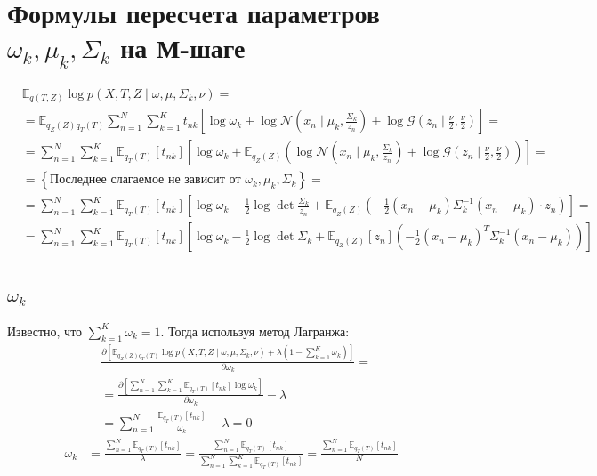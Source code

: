 \documentclass[12pt, a4paper]{article}
\begin{document}
    \section{Формулы пересчета параметров $\omega_k, \mu_k, \Sigma_k$ на М-шаге}
        \begin{align*}
            &\mathbb{E}_{q(T, Z)}\log p(X, T, Z\mid \omega, \mu, \Sigma_k, \nu) = \\
            & = \mathbb{E}_{q_Z(Z)q_T(T)}\sum_{n=1}^{N}\sum_{k=1}^{K}t_{nk}\left[\log\omega_k + \log\mathcal{N}(x_n\mid \mu_k, \frac{\Sigma_k}{z_n}) + \log\mathcal{G}(z_n\mid \frac{\nu}{2}, \frac{\nu}{2}) \right] =\\
            & = \sum_{n=1}^{N}\sum_{k=1}^{K}\mathbb{E}_{q_T(T)}\left[t_{nk}\right]\left[\log\omega_k + \mathbb{E}_{q_Z(Z)}\left(\log\mathcal{N}(x_n\mid \mu_k, \frac{\Sigma_k}{z_n}) + \log\mathcal{G}(z_n\mid \frac{\nu}{2}, \frac{\nu}{2})\right) \right] =\\
            & = \left\{\text{Последнее слагаемое не зависит от $\omega_k, \mu_k, \Sigma_k$}\right\} = \\
            & = \sum_{n=1}^{N}\sum_{k=1}^{K}\mathbb{E}_{q_T(T)}\left[t_{nk}\right]\left[\log\omega_k - \frac{1}{2}\log\det{\frac{\Sigma_k}{z_n}} + \mathbb{E}_{q_Z(Z)}\left(- \frac{1}{2}(x_n - \mu_k)\Sigma_k^{-1}(x_n - \mu_k) \cdot z_n \right)\right] =\\
            & = \sum_{n=1}^{N}\sum_{k=1}^{K}\mathbb{E}_{q_T(T)}\left[t_{nk}\right]\left[\log\omega_k -\frac{1}{2}\log\det{\Sigma_k} + \mathbb{E}_{q_Z(Z)}\left[z_{n}\right]\left(- \frac{1}{2}(x_n - \mu_k)^T\Sigma_k^{-1}(x_n - \mu_k) \right)\right]
        \end{align*}

        \subsection{$\omega_k$}
            Известно, что $\sum_{k = 1}^{K}\omega_k = 1$. Тогда используя метод Лагранжа:
            \begin{align*}
                &\frac{\partial \left[\mathbb{E}_{q_Z(Z)q_T(T)}\log p(X, T, Z\mid \omega, \mu, \Sigma_k, \nu) + \lambda\left(1 - \sum_{k = 1}^{K}\omega_k\right)\right]}{\partial \omega_k} = \\
                & = \frac{\partial \left[\sum_{n=1}^{N}\sum_{k=1}^{K}\mathbb{E}_{q_T(T)}\left[t_{nk}\right]\log\omega_k\right]}{\partial \omega_k} - \lambda \\
                & = \sum_{n=1}^{N}\frac{\mathbb{E}_{q_T(T)}\left[t_{nk}\right]}{\omega_k} - \lambda = 0
            \end{align*}
            \begin{align}
                \omega_k
                & = \frac{\sum_{n=1}^{N}\mathbb{E}_{q_T(T)}\left[t_{nk}\right]}{\lambda} = \frac{\sum_{n=1}^{N}\mathbb{E}_{q_T(T)}\left[t_{nk}\right]}{\sum_{n=1}^{N}\sum_{k=1}^{K}\mathbb{E}_{q_T(T)}\left[t_{nk}\right]} = \frac{\sum_{n=1}^{N}\mathbb{E}_{q_T(T)}\left[t_{nk}\right]}{N}
            \end{align}
\end{document}
